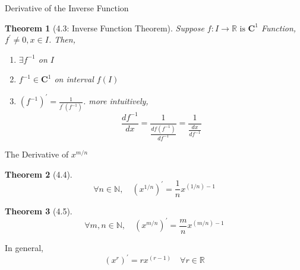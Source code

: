 \documentclass[final]{beamer}
\newtheorem{thm}{Theorem}
\begin{document}
\begin{frame}[t]{Derivative of the Inverse Function}
	\begin{thm}
		[4.3: Inverse Function Theorem] Suppose $f:I\rightarrow \mathbb{R} \text{ is } \mathbf{C}^1$ Function, $f^\prime \neq 0, x\in I$. Then,
		\begin{enumerate}
			\item $\exists f^{-1}$ on $I$
			\item $f^{-1}\in \mathbf{C}^1$ on interval $f(I)$
			\item $(f^{-1})^\prime = \frac{1}{f^\prime(f^{-1})}$. more intuitively, 
			\[
				\frac{df^{-1}}{dx} = \frac{1}{\frac{df(f^{-1})}{df^{-1}}}=\frac{1}{\frac{dx}{df^{-1}}}
			\]
		\end{enumerate}
	\end{thm}
\end{frame}

\begin{frame}[t]{The Derivative of $x^{m/n}$}
	\begin{thm}
		[4.4] \[
			\forall n\in\mathbb{N},\quad (x^{1/n})^\prime = \frac{1}{n} x^{(1/n)-1}
		\]
	\end{thm}
	\begin{thm}
		[4.5] \[
			\forall m,n\in\mathbb{N},\quad (x^{m/n})^\prime = \frac{m}{n} x^{(m/n)-1}
		\]
	\end{thm}
	In general, 
	\[
		(x^r)^\prime = rx^{(r-1)}\quad \forall r\in\mathbb{R}
	\]
\end{frame}

\end{document}

